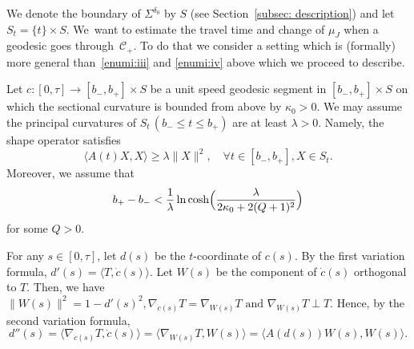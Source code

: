 \documentclass[10pt]{amsart}
\theoremstyle{definition}
\renewcommand{\>}{{\rangle}}
\newcommand{\<}{{\langle}}
\begin{document}
We denote the boundary of $\Sigma^{\delta_0}$ by $S$ (see Section~\ref{subsec: description}) and let $S_t=\{t\}\times S$.
We~want to estimate the travel time and change of $\mu_J$ when a geodesic goes through~$\mathcal{C}_+$. { To do that we consider} a setting which is (formally) more general than~\eqref{enumi:iii} and \eqref{enumi:iv} above which we proceed to describe.

Let $c: [0,\tau]\to [b_-, b_+] \times S $ be a unit speed geodesic segment in $[b_-, b_+] \times S$ on which the sectional curvature is bounded from above by $\kappa_0>0$. We may assume the principal curvatures of $S_t\,(b_-\leq t\leq b_+)$ are at least $\lambda>0$. Namely, the shape operator satisfies
\begin{equation}\label{eq: lower_bd_A}
\langle A(t)X,X\rangle\geq \lambda \|X\|^2,\quad \forall t\in[b_-, b_+], X\in S_t.
\end{equation}
Moreover, we assume that
\begin{equation}\label{eq: lower_bd_width}
b_+-b_-<\frac{1}{\lambda}\ln\cosh\Bigl(\frac{\lambda}{2\kappa_0+2(Q+1)^2}\Bigr)
\end{equation}
for some $Q>0$.

For any $s\in[0,\tau]$, let $d(s)$ be the $t$-coordinate of $c(s)$. By the first variation formula, $d'(s)=\langle T, \dot{c}(s)\rangle$. Let $W(s)$ be the component of $\dot{c}(s)$ orthogonal to $T$. Then, we have $\|W(s)\|^2=1-d'(s)^2, \nabla_{\dot{c}(s)} T=\nabla_{W(s)} T\text{ and }\nabla_{W(s)} T\perp T.$ Hence, by the second variation formula,
\begin{equation}\label{eq: d''}
d''(s)=\langle \nabla_ {\dot{c}(s)} T, \dot{c}(s)\rangle=\langle \nabla_ {W(s)} T, W(s)\rangle=\langle A(d(s))W(s), W(s)\rangle.
\end{equation}
\end{document}
